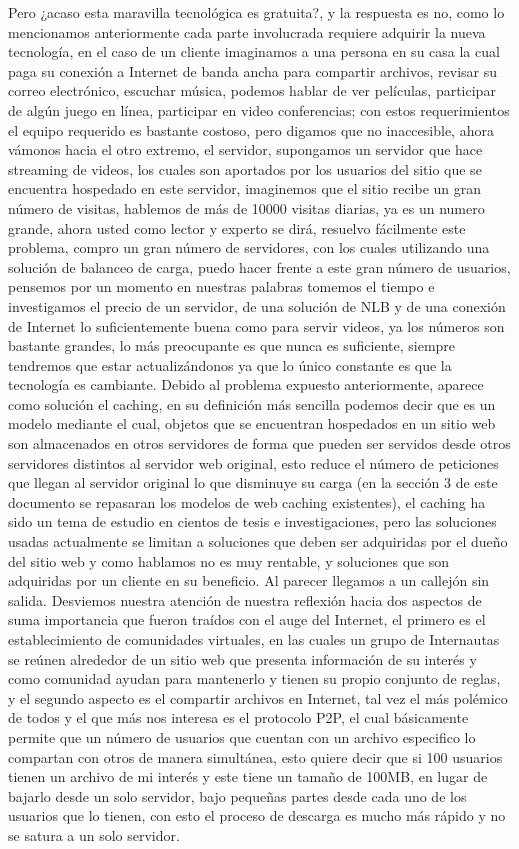 Pero ¿acaso esta maravilla tecnológica es gratuita?, y la respuesta es no, como lo mencionamos anteriormente cada parte involucrada requiere adquirir la nueva tecnología, en el caso de un cliente imaginamos a una persona en su casa la cual paga su conexión a Internet de banda ancha para compartir archivos, revisar su correo electrónico, escuchar música, podemos hablar de ver películas, participar de algún juego en línea, participar en video conferencias; con estos requerimientos el equipo requerido es bastante costoso, pero digamos que no inaccesible, ahora vámonos hacia el otro extremo, el servidor, supongamos un servidor que hace streaming de videos, los cuales son aportados por los usuarios del sitio que se encuentra hospedado en este servidor, imaginemos que el sitio recibe un gran número de visitas, hablemos de más de 10000 visitas diarias, ya es un numero grande, ahora usted como lector y experto se dirá, resuelvo fácilmente este problema, compro un gran número de servidores, con los cuales utilizando una solución de balanceo de carga, puedo hacer frente a este gran número de usuarios, pensemos por un momento en nuestras palabras tomemos el tiempo e investigamos el precio de un servidor, de una solución de NLB y de una conexión de Internet lo suficientemente buena como para servir videos, ya los números son bastante grandes, lo más preocupante es que nunca es suficiente, siempre tendremos que estar actualizándonos ya que lo único constante es que la tecnología es cambiante.
Debido al problema expuesto anteriormente, aparece como solución el caching, en su definición más sencilla podemos decir que es un modelo mediante el cual, objetos que se encuentran hospedados en un sitio web son almacenados en otros servidores de forma que pueden ser servidos desde otros servidores distintos al servidor web original, esto reduce el número de peticiones que llegan al servidor original lo que disminuye su carga (en la sección 3 de este documento se repasaran los modelos de web caching existentes), el caching ha sido un tema de estudio en cientos de tesis e investigaciones, pero las soluciones usadas actualmente se limitan a soluciones que deben ser adquiridas por el dueño del sitio web y como hablamos no es muy rentable, y soluciones que son adquiridas por un cliente en su beneficio. Al parecer llegamos a un callejón sin salida.
Desviemos nuestra atención de nuestra reflexión hacia dos aspectos de suma importancia que fueron traídos con el auge del Internet, el primero es el establecimiento de comunidades virtuales, en las cuales un grupo de Internautas se reúnen alrededor de un sitio web que presenta información de su interés y como comunidad ayudan para mantenerlo y tienen su propio conjunto de reglas, y el segundo aspecto es el compartir archivos en Internet, tal vez el más polémico de todos y el que más nos interesa es el protocolo P2P, el cual básicamente permite que un número de usuarios que cuentan con un archivo especifico lo compartan con otros de manera simultánea, esto quiere decir que si 100 usuarios tienen un archivo de mi interés y este tiene un tamaño de 100MB, en lugar de bajarlo desde un solo servidor, bajo pequeñas partes desde cada uno de los usuarios que lo tienen, con esto el proceso de descarga es mucho más rápido y no se satura a un solo servidor.
